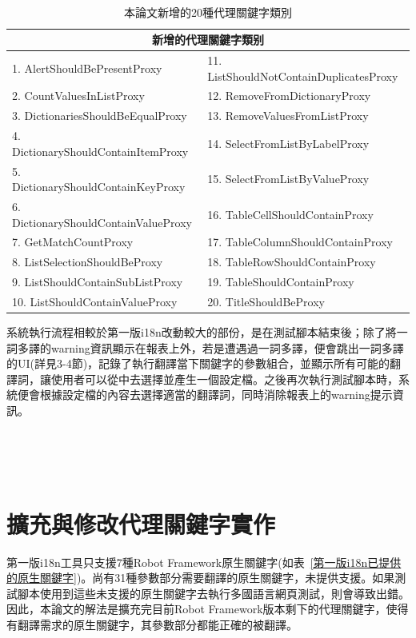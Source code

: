\hspace*{\fill} \\

\begin{table}[H]
    \centering
        \begin{tabular}{|l|l|}
        \hline
        \multicolumn{2}{|c|}{新增的代理關鍵字類别} \\ \hline
        1. AlertShouldBePresentProxy & 11. ListShouldNotContainDuplicatesProxy\\ 
        2. CountValuesInListProxy & 12. RemoveFromDictionaryProxy\\ 
        3. DictionariesShouldBeEqualProxy & 13. RemoveValuesFromListProxy\\
        4. DictionaryShouldContainItemProxy & 14. SelectFromListByLabelProxy\\
        5. DictionaryShouldContainKeyProxy & 15. SelectFromListByValueProxy\\
        6. DictionaryShouldContainValueProxy & 16. TableCellShouldContainProxy\\
        7. GetMatchCountProxy & 17. TableColumnShouldContainProxy\\
        8. ListSelectionShouldBeProxy & 18. TableRowShouldContainProxy\\
        9. ListShouldContainSubListProxy & 19. TableShouldContainProxy\\
        10. ListShouldContainValueProxy & 20. TitleShouldBeProxy\\   
        \hline
        \end{tabular}
    \caption{本論文新增的20種代理關鍵字類別}
    \label{本論文新增的20種代理關鍵字類別}
\end{table}

系統執行流程相較於第一版i18n改動較大的部份，是在測試腳本結束後；除了將一詞多譯的warning資訊顯示在報表上外，若是遭遇過一詞多譯，便會跳出一詞多譯的UI(詳見3-4節)，記錄了執行翻譯當下關鍵字的參數組合，並顯示所有可能的翻譯詞，讓使用者可以從中去選擇並產生一個設定檔。之後再次執行測試腳本時，系統便會根據設定檔的內容去選擇適當的翻譯詞，同時消除報表上的warning提示資訊。

\hspace*{\fill} \\
\\ \hspace*{\fill} \\

\section{擴充與修改代理關鍵字實作}
第一版i18n工具只支援7種Robot Framework原生關鍵字(如表~\ref{第一版i18n已提供的原生關鍵字})\cite{i18n}。尚有31種參數部分需要翻譯的原生關鍵字，未提供支援。如果測試腳本使用到這些未支援的原生關鍵字去執行多國語言網頁測試，則會導致出錯。因此，本論文的解法是擴充完目前Robot Framework版本剩下的代理關鍵字，使得有翻譯需求的原生關鍵字，其參數部分都能正確的被翻譯。

